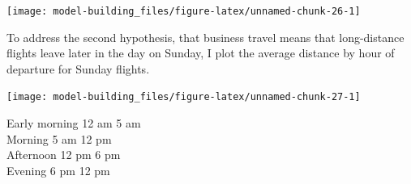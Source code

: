 \documentclass[]{book}
\newenvironment{Shaded}{\begin{snugshade}}{\end{snugshade}}
\newcommand{\DataTypeTok}[1]{\textcolor[rgb]{0.13,0.29,0.53}{#1}}
\newcommand{\DecValTok}[1]{\textcolor[rgb]{0.00,0.00,0.81}{#1}}
\newcommand{\KeywordTok}[1]{\textcolor[rgb]{0.13,0.29,0.53}{\textbf{#1}}}
\newcommand{\NormalTok}[1]{#1}
\newcommand{\OperatorTok}[1]{\textcolor[rgb]{0.81,0.36,0.00}{\textbf{#1}}}
\newcommand{\OtherTok}[1]{\textcolor[rgb]{0.56,0.35,0.01}{#1}}
\newcommand{\StringTok}[1]{\textcolor[rgb]{0.31,0.60,0.02}{#1}}
\theoremstyle{plain}
\theoremstyle{remark}
\begin{document}
\begin{center}\texttt{[image: model-building\_files/figure-latex/unnamed-chunk-26-1]} \end{center}

To address the second hypothesis, that business travel means that long-distance flights
leave later in the day on Sunday, I plot the average distance by hour of departure
for Sunday flights.

\begin{Shaded}
\end{Shaded}

\begin{center}\texttt{[image: model-building\_files/figure-latex/unnamed-chunk-27-1]} \end{center}

Early morning \textbar{} 12 am \textbar{} 5 am \textbar{}\\
Morning \textbar{} 5 am \textbar{} 12 pm \textbar{}\\
Afternoon \textbar{} 12 pm \textbar{} 6 pm \textbar{}\\
Evening \textbar{} 6 pm \textbar{} 12 pm \textbar{}
\end{document}
